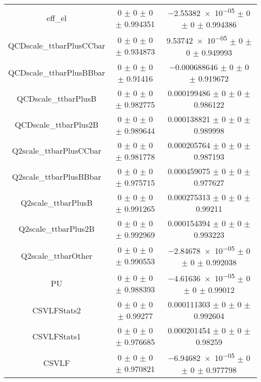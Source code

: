 \begin{table}
\begin{tabular}{ccc}
eff\_el 	& \num{0} $\pm$ \num{0} $\pm$ \num{0} $\pm$ \num{0.994351} 	& \num{-2.55382e-05} $\pm$ \num{0} $\pm$ \num{0} $\pm$ \num{0.994386}\\
QCDscale\_ttbarPlusCCbar 	& \num{0} $\pm$ \num{0} $\pm$ \num{0} $\pm$ \num{0.934873} 	& \num{9.53742e-05} $\pm$ \num{0} $\pm$ \num{0} $\pm$ \num{0.949993}\\
QCDscale\_ttbarPlusBBbar 	& \num{0} $\pm$ \num{0} $\pm$ \num{0} $\pm$ \num{0.91416} 	& \num{-0.000688646} $\pm$ \num{0} $\pm$ \num{0} $\pm$ \num{0.919672}\\
QCDscale\_ttbarPlusB 	& \num{0} $\pm$ \num{0} $\pm$ \num{0} $\pm$ \num{0.982775} 	& \num{0.000199486} $\pm$ \num{0} $\pm$ \num{0} $\pm$ \num{0.986122}\\
QCDscale\_ttbarPlus2B 	& \num{0} $\pm$ \num{0} $\pm$ \num{0} $\pm$ \num{0.989644} 	& \num{0.000138821} $\pm$ \num{0} $\pm$ \num{0} $\pm$ \num{0.989998}\\
Q2scale\_ttbarPlusCCbar 	& \num{0} $\pm$ \num{0} $\pm$ \num{0} $\pm$ \num{0.981778} 	& \num{0.000205764} $\pm$ \num{0} $\pm$ \num{0} $\pm$ \num{0.987193}\\
Q2scale\_ttbarPlusBBbar 	& \num{0} $\pm$ \num{0} $\pm$ \num{0} $\pm$ \num{0.975715} 	& \num{0.000459075} $\pm$ \num{0} $\pm$ \num{0} $\pm$ \num{0.977627}\\
Q2scale\_ttbarPlusB 	& \num{0} $\pm$ \num{0} $\pm$ \num{0} $\pm$ \num{0.991265} 	& \num{0.000275313} $\pm$ \num{0} $\pm$ \num{0} $\pm$ \num{0.99211}\\
Q2scale\_ttbarPlus2B 	& \num{0} $\pm$ \num{0} $\pm$ \num{0} $\pm$ \num{0.992969} 	& \num{0.000154394} $\pm$ \num{0} $\pm$ \num{0} $\pm$ \num{0.993223}\\
Q2scale\_ttbarOther 	& \num{0} $\pm$ \num{0} $\pm$ \num{0} $\pm$ \num{0.990553} 	& \num{-2.84678e-05} $\pm$ \num{0} $\pm$ \num{0} $\pm$ \num{0.992038}\\
PU 	& \num{0} $\pm$ \num{0} $\pm$ \num{0} $\pm$ \num{0.988393} 	& \num{-4.61636e-05} $\pm$ \num{0} $\pm$ \num{0} $\pm$ \num{0.99012}\\
CSVLFStats2 	& \num{0} $\pm$ \num{0} $\pm$ \num{0} $\pm$ \num{0.99277} 	& \num{0.000111303} $\pm$ \num{0} $\pm$ \num{0} $\pm$ \num{0.992604}\\
CSVLFStats1 	& \num{0} $\pm$ \num{0} $\pm$ \num{0} $\pm$ \num{0.976685} 	& \num{0.000201454} $\pm$ \num{0} $\pm$ \num{0} $\pm$ \num{0.98259}\\
CSVLF 	& \num{0} $\pm$ \num{0} $\pm$ \num{0} $\pm$ \num{0.970821} 	& \num{-6.94682e-05} $\pm$ \num{0} $\pm$ \num{0} $\pm$ \num{0.977798}\\

\end{tabular}
\end{table}

